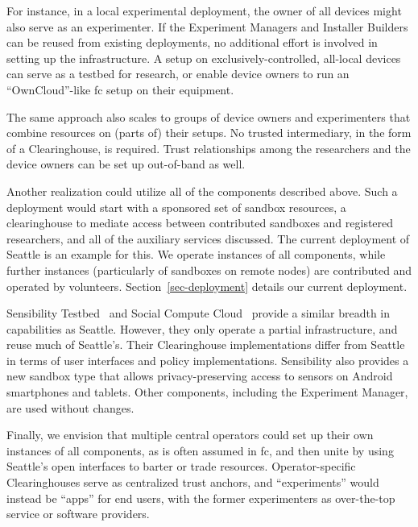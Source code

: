 For instance, in a local experimental deployment, the owner of all
devices might also serve as an experimenter. If
the Experiment Managers and Installer Builders can be reused
from existing deployments, no additional effort is involved in
setting up the infrastructure.
A setup on exclusively-controlled, all-local devices can serve as
a testbed for research, or enable device owners to run an
``OwnCloud''-like \gls{fc} setup on their equipment.

The same approach also scales to groups of device owners and experimenters
that combine resources on (parts of) their setups. No trusted
intermediary, in the form of a Clearinghouse, is required.
Trust relationships among the researchers and the device owners
can be set up out-of-band as well.

Another realization could utilize all of the components described above.
Such a deployment would start with a sponsored set of sandbox resources,
a clearinghouse to mediate access between contributed sandboxes
and registered researchers, and all of the auxiliary services
discussed. The current deployment of Seattle is an example for
this. We operate instances of all components, while further instances
(particularly of sandboxes on remote nodes) are contributed and
operated by volunteers.
Section~\ref{sec-deployment} details our current deployment.

Sensibility Testbed~\cite{zhuang2014sensibility} and Social Compute
Cloud~\cite{caton2014social} provide a similar breadth in capabilities
as Seattle. However, they only operate a partial infrastructure, and
reuse much of Seattle's. Their Clearinghouse
implementations differ from Seattle in terms of user interfaces and
policy implementations. Sensibility also provides a new sandbox
type that allows privacy-preserving access to sensors on Android
smartphones and tablets. Other components, including the Experiment
Manager, are used without changes.

Finally, we envision that multiple central operators could set up their
own instances of all components, as is often assumed in \gls{fc}, and then
unite by using Seattle's open interfaces
to barter or trade resources. %
Operator-specific Clearinghouses serve as centralized trust
anchors, and ``experiments'' would instead be ``apps'' for
end users, with the former experimenters as over-the-top service or
software providers.
